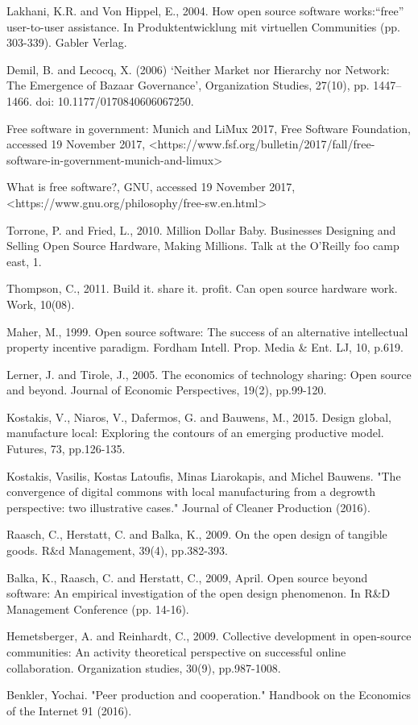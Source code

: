 Lakhani, K.R. and Von Hippel, E., 2004. How open source software works:“free” user-to-user assistance. In Produktentwicklung mit virtuellen Communities (pp. 303-339). Gabler Verlag.

\bibitem{}  Demil, B. and Lecocq, X. (2006) ‘Neither Market nor Hierarchy nor Network: The Emergence of Bazaar Governance’, Organization Studies, 27(10), pp. 1447–1466. doi: 10.1177/0170840606067250.

 Free software in government: Munich and LiMux 2017, Free Software Foundation, accessed 19 November 2017, <https://www.fsf.org/bulletin/2017/fall/free-software-in-government-munich-and-limux>

 What is free software?, GNU, accessed 19 November 2017,
<https://www.gnu.org/philosophy/free-sw.en.html>

Torrone, P. and Fried, L., 2010. Million Dollar Baby. Businesses Designing and Selling Open Source Hardware, Making Millions. Talk at the O'Reilly foo camp east, 1.


Thompson, C., 2011. Build it. share it. profit. Can open source hardware work. Work, 10(08).

Maher, M., 1999. Open source software: The success of an alternative intellectual property incentive paradigm. Fordham Intell. Prop. Media & Ent. LJ, 10, p.619.

Lerner, J. and Tirole, J., 2005. The economics of technology sharing: Open source and beyond. Journal of Economic Perspectives, 19(2), pp.99-120.

Kostakis, V., Niaros, V., Dafermos, G. and Bauwens, M., 2015. Design global, manufacture local: Exploring the contours of an emerging productive model. Futures, 73, pp.126-135.

Kostakis, Vasilis, Kostas Latoufis, Minas Liarokapis, and Michel Bauwens. "The convergence of digital commons with local manufacturing from a degrowth perspective: two illustrative cases." Journal of Cleaner Production (2016).

Raasch, C., Herstatt, C. and Balka, K., 2009. On the open design of tangible goods. R&d Management, 39(4), pp.382-393.

Balka, K., Raasch, C. and Herstatt, C., 2009, April. Open source beyond software: An empirical investigation of the open design phenomenon. In R&D Management Conference (pp. 14-16).

Hemetsberger, A. and Reinhardt, C., 2009. Collective development in open-source communities: An activity theoretical perspective on successful online collaboration. Organization studies, 30(9), pp.987-1008.



Benkler, Yochai. "Peer production and cooperation." Handbook on the Economics of the Internet 91 (2016).
